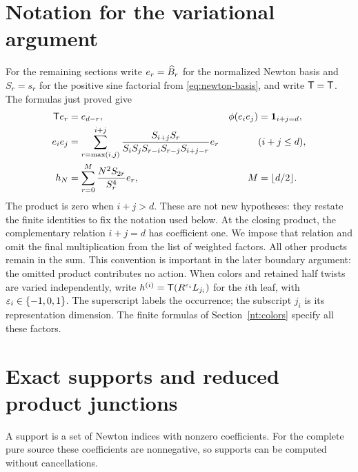 \section*{Notation for the variational argument}
For the remaining sections write $e_r=\widehat B_r$ for the normalized
Newton basis and $S_r=s_r$ for the positive sine factorial from \eqref{eq:newton-basis}, and write $\mathsf T=\mathsf T$.
The formulas just proved give
\begin{align}
 \mathsf T e_r&=e_{d-r},&\phi(e_i e_j)&=\mathbf1_{i+j=d},\label{st:pairing}\\
 e_i e_j&=\sum_{r=\max(i,j)}^{i+j}
 \frac{S_{i+j}S_r}{S_iS_jS_{r-i}S_{r-j}S_{i+j-r}}e_r
 &&(i+j\le d),\label{st:product}\\
 h_N&=\sum_{r=0}^M\frac{N^2S_{2r}}{S_r^4}e_r,
 & M&=\lfloor d/2\rfloor.\label{st:leaf}
\end{align}
The product is zero when $i+j>d$. These are not new hypotheses:
they restate the finite identities to fix the notation used below.
At the closing product, the complementary relation $i+j=d$
has coefficient one. We impose that relation and omit the final
multiplication from the list of weighted factors. All other products
remain in the sum. This convention is important in the later boundary
argument: the omitted product contributes no action.
When colors and retained half twists are varied independently, write
$h^{(i)}=\mathsf T(R^{\varepsilon_i}L_{j_i})$ for the $i$th leaf, with
$\varepsilon_i\in\{-1,0,1\}$. The superscript labels the occurrence;
the subscript $j_i$ is its representation dimension. The finite formulas of
Section~\ref{nt:colors} specify all these factors.

\section{Exact supports and reduced product junctions}\label{st:syntax}
A support is a set of Newton indices with nonzero coefficients.
For the complete pure source these coefficients are nonnegative,
so supports can be computed without cancellations.


